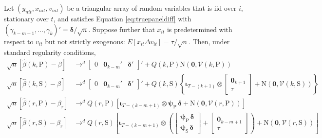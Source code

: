 \begin{thm}
  \label{thm:limitDpanel}
  Let $(y_{nit},x_{nit}, v_{nit})$ be a triangular array of random variables that is iid over $i$, stationary over $t$, and satisfies Equation \ref{eq:truepaneldiff} with $(\gamma_{k-m+1}, \ldots, \gamma_k)' = \boldsymbol{\delta} / \sqrt{n}$.
  Suppose further that $x_{it}$ is predetermined with respect to $v_{it}$ but not strictly exogenous: $E[x_{it}\Delta v_{it}] = \tau/\sqrt{n}$.
  Then, under standard regularity conditions,
  \begin{align*}
    \sqrt{n}\left[ \widehat{\beta}(k,\text{P})-\beta \right] &\rightarrow^d 
    \left[
    \begin{array}{ccc}
    0 & \mathbf{0}_{k-m}'& \boldsymbol{\delta}'
    \end{array}
  \right]' + 
    Q\left(k,\text{P} \right) \mbox{N}\left(\mathbf{0}, \mathcal{V}(k,\text{P})\right)  \\
    \sqrt{n}\left[ \widehat{\beta}(k,\text{S})-\beta \right] &\rightarrow^d 
    \left[
    \begin{array}{ccc}
    0 & \mathbf{0}_{k-m}'& \boldsymbol{\delta}'
    \end{array}
  \right]' + 
     Q\left(k,\text{S} \right) \left\{ \boldsymbol{\iota}_{T-(k +1)} \otimes \left[
    \begin{array}{c}
      \mathbf{0}_{k+1} \\ \tau
    \end{array}
  \right] + \mbox{N}\left(\mathbf{0}, \mathcal{V}(k,\text{S})\right)\right\}\\
    \sqrt{n}\left[ \widehat{\beta}(r,\text{P})- \beta_r \right] &\rightarrow^d Q(r,\text{P}) \left[\boldsymbol{\iota}_{T-(k-m+1)} \otimes  \boldsymbol{\psi}_{\text{P}}\, \boldsymbol{\delta} + \mbox{N}\left(\mathbf{0}, \mathcal{V}(r,\text{P}) \right) \right]\\
    \sqrt{n}\left[ \widehat{\beta}(r,\text{S})- \beta_r\right] &\rightarrow^d Q(r,\text{S}) \left[\boldsymbol{\iota}_{T-(k-m+1)} \otimes 
    \left(  \left[
  \begin{array}{c}
    \boldsymbol{\psi}_{\text{P}}\, \boldsymbol{\delta} \\ \boldsymbol{\psi}_{\text{S}}\, \boldsymbol{\delta}
\end{array}
\right] + \left[
\begin{array}{c}
  \mathbf{0}_{k-m+1} \\ \tau
\end{array}
\right]\right) + \mbox{N}\left( \mathbf{0}, \mathcal{V}\left(r,\text{S}\right) \right)\right]

\end{align*}
\end{thm}
